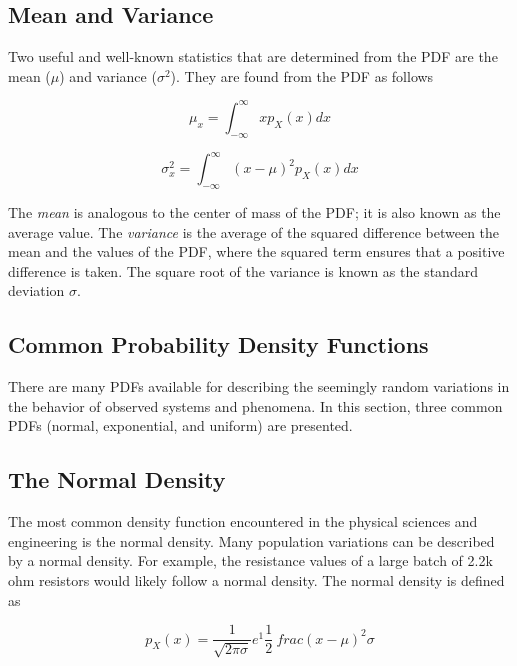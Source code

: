 \subsection{Mean and Variance}
\label{subsection:mean-and-variance}

Two useful and well-known statistics that are determined from the PDF
are the mean ($\mu$) and variance ($\sigma^2$). 
They are found from the PDF as follows

\begin{equation}
\label{equ:integralDeltaSliceOfPDF}
\mu_x = \int^{\infty}_{-\infty}xp_X(x)dx
\end{equation}

\begin{equation}
\label{equ:integralDeltaSliceOfPDF}
\sigma^2_x = \int^{\infty}_{-\infty}(x-\mu)^2 p_X(x)dx
\end{equation}

The \emph{mean} is analogous to the center of mass of the PDF; it is
also known as the average value. The \emph{variance} is the average of
the squared difference between the mean and the values of the PDF, where
the squared term ensures that a positive difference is taken. The square
root of the variance is known as the standard deviation $\sigma$.

\subsection{Common Probability Density Functions}
\label{subsection:common-probability-density-functions}

There are many PDFs available for describing the seemingly random
variations in the behavior of observed systems and phenomena. In this
section, three common PDFs (normal, exponential, and uniform) are
presented.

\subsection*{The Normal Density}
\label{subsection:the-normal-density}


The most common density function encountered in the physical sciences
and engineering is the normal density. Many population
variations can be described by a normal density. For example, the
resistance values of a large batch of 2.2k ohm resistors would likely
follow a normal density. The normal density is defined as

\begin{equation}
\label{equ:normalDensity}
p_X(x) = \frac{1}{\sqrt{2\pi\sigma}} e^1\frac{1}{2} \ frac{(x-\mu)^2}{\sigma}
\end{equation}

